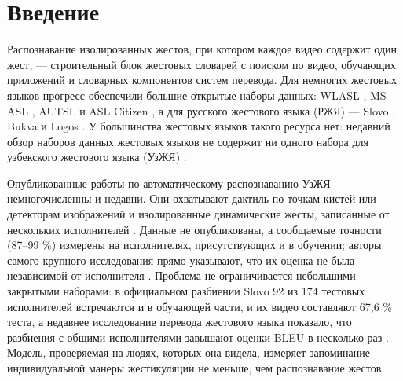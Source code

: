 \hypertarget{ux432ux432ux435ux434ux435ux43dux438ux435}{%
\section{Введение}\label{ux432ux432ux435ux434ux435ux43dux438ux435}}

Распознавание изолированных жестов, при котором каждое видео содержит один жест, --- строительный блок жестовых словарей с поиском по видео, обучающих приложений и словарных компонентов систем перевода. Для немногих жестовых языков прогресс обеспечили большие открытые наборы данных: WLASL \citep{2020_li_wlasl}, MS-ASL \citep{2019_joze_msasl}, AUTSL \citep{2020_sincan_autsl} и ASL Citizen \citep{2023_desai_asl_citizen}, а для русского жестового языка (РЖЯ) --- Slovo \citep{2023_kapitanov_slovo}, Bukva \citep{2024_kvanchiani_bukva} и Logos \citep{2025_ovodov_logos}. У большинства жестовых языков такого ресурса нет: недавний обзор наборов данных жестовых языков не содержит ни одного набора для узбекского жестового языка (УзЖЯ) \citep{2026_ni_sign_language_datasets_survey}.

Опубликованные работы по автоматическому распознаванию УзЖЯ немногочисленны и недавни. Они охватывают дактиль по точкам кистей или детекторам изображений \citep{2026_jovlieva_webcam_uzbek_fingerspelling, 2024_kayumov_uzsl_latin_angular_signs, 2024_akhmedov_uzsl_dactyl_yolo} и изолированные динамические жесты, записанные от нескольких исполнителей \citep{2026_ergashev_cnnlstm_vs_squeezeformer_uzsl, 2025_akkomron_uzslr_isolated_dynamic}. Данные не опубликованы, а сообщаемые точности (87--99 \%) измерены на исполнителях, присутствующих и в обучении; авторы самого крупного исследования прямо указывают, что их оценка не была независимой от исполнителя \citep{2026_ergashev_cnnlstm_vs_squeezeformer_uzsl}. Проблема не ограничивается небольшими закрытыми наборами: в официальном разбиении Slovo 92 из 174 тестовых исполнителей встречаются и в обучающей части, и их видео составляют 67,6 \% теста, а недавнее исследование перевода жестового языка показало, что разбиения с общими исполнителями завышают оценки BLEU в несколько раз \citep{2026_artiaga_signer_dependence_slt}. Модель, проверяемая на людях, которых она видела, измеряет запоминание индивидуальной манеры жестикуляции не меньше, чем распознавание жестов.

